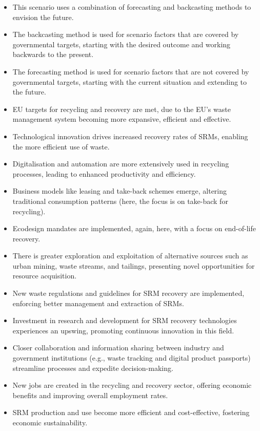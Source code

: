\begin{itemize}
\item This scenario uses a combination of forecasting and backcasting methods to envision the future.
\item The backcasting method is used for scenario factors that are covered by governmental targets, starting with the desired outcome and working backwards to the present.
\item The forecasting method is used for scenario factors that are not covered by governmental targets, starting with the current situation and extending to the future.
\item EU targets for recycling and recovery are met, due to the EU's waste management system becoming more expansive, efficient and effective.
\item Technological innovation drives increased recovery rates of SRMs, enabling the more efficient use of waste.
\item Digitalisation and automation are more extensively used in recycling processes, leading to enhanced productivity and efficiency.
\item Business models like leasing and take-back schemes emerge, altering traditional consumption patterns (here, the focus is on take-back for recycling).
\item Ecodesign mandates are implemented, again, here, with a focus on end-of-life recovery.
\item There is greater exploration and exploitation of alternative sources such as urban mining, waste streams, and tailings, presenting novel opportunities for resource acquisition.
\item New waste regulations and guidelines for SRM recovery are implemented, enforcing better management and extraction of SRMs.
\item Investment in research and development for SRM recovery technologies experiences an upswing, promoting continuous innovation in this field.
\item Closer collaboration and information sharing between industry and government institutions (e.g., waste tracking and digital product passports) streamline processes and expedite decision-making.
\item New jobs are created in the recycling and recovery sector, offering economic benefits and improving overall employment rates.
\item SRM production and use become more efficient and cost-effective, fostering economic sustainability.
\end{itemize}

